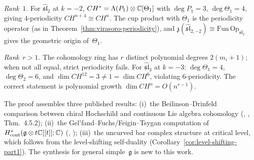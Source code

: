 \begin{remark}\label{rem:rank-distinction}
\label{rem:affine-periodicity-analysis}
\emph{Rank~$1$.}
For $\hat{\mathfrak{sl}}_2$ at $k = -2$, $CH^* = \Lambda(P_1) \otimes \mathbb{C}[\Theta_1]$ with $\deg P_1 = 3$, $\deg\Theta_1 = 4$, giving $4$-periodicity $CH^{n+4} \cong CH^n$.  The cup product with $\Theta_1$ is the periodicity operator (as in Theorem~\ref{thm:virasoro-periodicity}), and $\mathfrak{z}(\hat{\mathfrak{sl}}_{2,-2}) \cong \mathrm{Fun}\,\mathrm{Op}_{\mathfrak{sl}_2}$ gives the geometric origin of~$\Theta_1$.

\emph{Rank~$r > 1$.}
The cohomology ring has $r$ distinct polynomial degrees $2(m_i + 1)$; when not all equal, strict periodicity fails.  For $\hat{\mathfrak{sl}}_3$ at $k = -3$: $\deg\Theta_1 = 4$, $\deg\Theta_2 = 6$, and $\dim CH^{12} = 3 \neq 1 = \dim CH^6$, violating $6$-periodicity.  The correct statement is polynomial growth $\dim CH^n = O(n^{r-1})$.
\end{remark}

\begin{remark}[Provenance]\label{rem:periodicity-provenance}
The proof assembles three published results:
(i)~the Beilinson--Drinfeld comparison between chiral Hochschild
and continuous Lie algebra cohomology (\ClaimStatusProvedElsewhere,
\cite{BD04}, Thm.~4.5.2);
(ii)~the Gel'fand--Fuchs/Feigin--Tsygan computation of
$H^*_{\mathrm{cont}}(\mathfrak{g} \otimes t\mathbb{C}[[t]]; \mathbb{C})$
(\ClaimStatusProvedElsewhere, \cite{FT87});
(iii)~the uncurved bar complex structure at critical level, which
follows from the level-shifting self-duality
(Corollary~\ref{cor:level-shifting-part1}).
The synthesis for general simple~$\mathfrak{g}$ is new to this work.
\end{remark}

